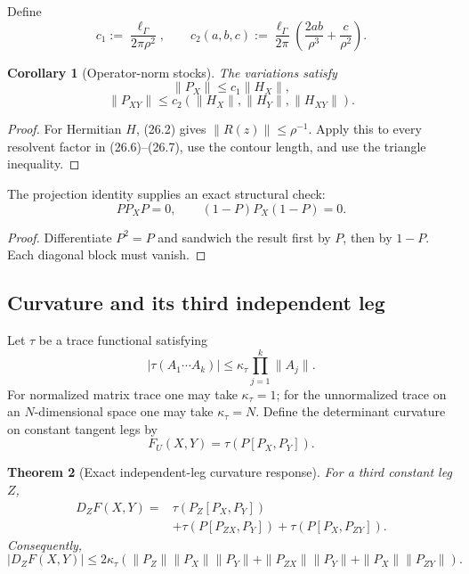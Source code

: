 \documentclass[11pt]{article}
\newtheorem{theorem}{Theorem}[section]
\newtheorem{corollary}[theorem]{Corollary}
\begin{document}
Define
\[
 c_1:=\frac{\ell_\Gamma}{2\pi\rho^2},
 \qquad
 c_2(a,b,c):=
 \frac{\ell_\Gamma}{2\pi}
 \left(\frac{2ab}{\rho^3}+\frac c{\rho^2}\right).
 \tag{26.8}
\]

\begin{corollary}[Operator-norm stocks]
\label{cor:v11v26-projector-bounds}
The variations satisfy
\[
 \|P_X\|\leq c_1\|H_X\|,
 \tag{26.9}
\]
\[
 \|P_{XY}\|
 \leq
 c_2(\|H_X\|,\|H_Y\|,\|H_{XY}\|).
 \tag{26.10}
\]
\end{corollary}

\begin{proof}
For Hermitian \(H\), (26.2) gives
\(\|R(z)\|\leq\rho^{-1}\).  Apply this to every resolvent factor in
(26.6)--(26.7), use the contour length, and use the triangle inequality.
\end{proof}

The projection identity supplies an exact structural check:
\[
 PP_XP=0,\qquad (1-P)P_X(1-P)=0.
 \tag{26.11}
\]

\begin{proof}
Differentiate \(P^2=P\) and sandwich the result first by \(P\), then by
\(1-P\).  Each diagonal block must vanish.
\end{proof}

\subsection{Curvature and its third independent leg}

Let \(\tau\) be a trace functional satisfying
\[
 |\tau(A_1\cdots A_k)|
 \leq\kappa_\tau\prod_{j=1}^k\|A_j\|.
 \tag{26.12}
\]
For normalized matrix trace one may take \(\kappa_\tau=1\); for the
unnormalized trace on an \(N\)-dimensional space one may take
\(\kappa_\tau=N\).  Define the determinant curvature on constant tangent
legs by
\[
 F_U(X,Y)
 =
 \tau\!\left(P[P_X,P_Y]\right).
 \tag{26.13}
\]

\begin{theorem}[Exact independent-leg curvature response]
\label{thm:v11v26-curvature-response}
For a third constant leg \(Z\),
\[
 \begin{split}
 D_ZF(X,Y)
 ={}&
 \tau\!\left(P_Z[P_X,P_Y]\right)\\
 &+\tau\!\left(P[P_{ZX},P_Y]\right)
 +\tau\!\left(P[P_X,P_{ZY}]\right).
 \end{split}
 \tag{26.14}
\]
Consequently,
\[
 |D_ZF(X,Y)|
 \leq
 2\kappa_\tau
 \left(
 \|P_Z\|\|P_X\|\|P_Y\|
 +\|P_{ZX}\|\|P_Y\|
 +\|P_X\|\|P_{ZY}\|
 \right).
 \tag{26.15}
\]
\end{theorem}
\end{document}
